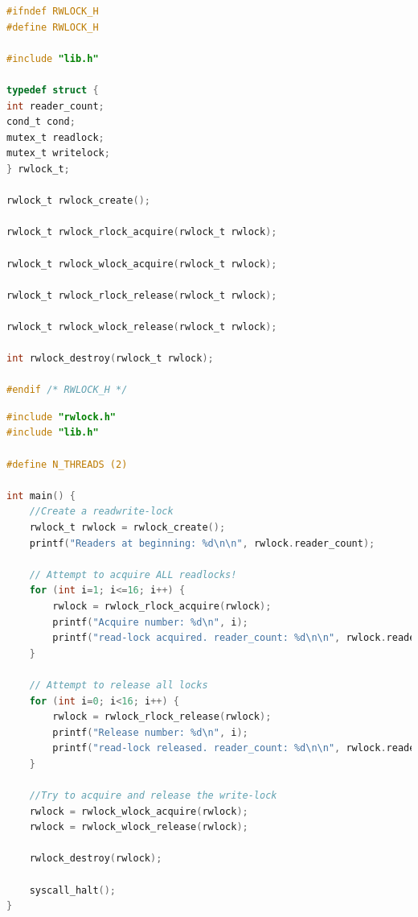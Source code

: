 \documentclass[11pt,a4paper]{article}
\theoremstyle{plain}
\theoremstyle{definition}
\theoremstyle{remark}
\numberwithin{equation}{section}
\begin{document}
\begin{lstlisting}[language=C,caption={rwlock.h},label={lst:rwlock.h}]
#ifndef RWLOCK_H
#define RWLOCK_H

#include "lib.h"

typedef struct {
int reader_count;
cond_t cond;
mutex_t readlock;
mutex_t writelock;
} rwlock_t;

rwlock_t rwlock_create();

rwlock_t rwlock_rlock_acquire(rwlock_t rwlock);

rwlock_t rwlock_wlock_acquire(rwlock_t rwlock);

rwlock_t rwlock_rlock_release(rwlock_t rwlock);

rwlock_t rwlock_wlock_release(rwlock_t rwlock);

int rwlock_destroy(rwlock_t rwlock);

#endif /* RWLOCK_H */
\end{lstlisting}

\begin{lstlisting}[language=C,caption={Test: rw\_own.c},label={lst:rw_own.c}]
#include "rwlock.h"
#include "lib.h"

#define N_THREADS (2)

int main() {
    //Create a readwrite-lock
    rwlock_t rwlock = rwlock_create();
    printf("Readers at beginning: %d\n\n", rwlock.reader_count);
    
    // Attempt to acquire ALL readlocks!
    for (int i=1; i<=16; i++) {
        rwlock = rwlock_rlock_acquire(rwlock);
        printf("Acquire number: %d\n", i);
        printf("read-lock acquired. reader_count: %d\n\n", rwlock.reader_count);
    }
    
    // Attempt to release all locks
    for (int i=0; i<16; i++) {
        rwlock = rwlock_rlock_release(rwlock);
        printf("Release number: %d\n", i);
        printf("read-lock released. reader_count: %d\n\n", rwlock.reader_count);
    }
    
    //Try to acquire and release the write-lock
    rwlock = rwlock_wlock_acquire(rwlock);
    rwlock = rwlock_wlock_release(rwlock);
    
    rwlock_destroy(rwlock);
    
    syscall_halt();
}
\end{lstlisting}
\end{document}
